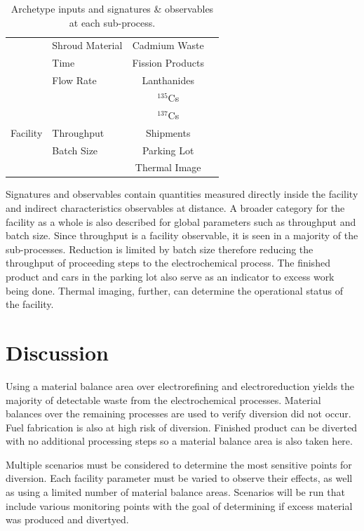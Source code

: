 \documentclass{anstrans}
\begin{document}
\begin{table}[h]
\begin{tabularx}{0.5\textwidth}{llcr}
		& Shroud Material & Cadmium Waste & \cite{lee_korean_2011} \\
		& Time & Fission Products & \cite{Borrelli_2017} \\
		& Flow Rate & Lanthanides & \\
		&  & $^{135}$Cs & \\
		&  & $^{137}$Cs & \\ \hline
		Facility & Throughput & Shipments & \\
		& Batch Size & Parking Lot & \\
		& & Thermal Image & \\
		\hline
	\end{tabularx}
	\caption {Archetype inputs and signatures \& observables at each sub-process.}
	\label {tab:params}
\end{table}

Signatures and observables contain quantities measured directly inside
the facility and indirect characteristics observables at distance. A broader category for the facility as a whole is also described for global parameters such as
throughput and batch size. Since throughput is a facility observable, 
it is seen in a majority of the sub-processes. Reduction is limited by 
batch size therefore reducing the throughput of proceeding steps to the 
electrochemical process. The finished product and cars in the parking lot also serve as an indicator to excess work being done. Thermal imaging, further, can determine the operational status of the facility. 


\section{Discussion}
Using a material balance area over electrorefining and electroreduction yields the majority of detectable waste from 
the electrochemical processes.  Material balances over the remaining 
processes are used to verify diversion did not occur. Fuel fabrication is also at high risk of diversion. 
Finished product can be diverted with no additional processing steps so a material balance area is also taken here. 

Multiple scenarios must be considered to determine the most sensitive points for diversion. 
Each facility parameter must be varied to observe their effects, as well as using a limited number of material balance areas. 
Scenarios will be run that include various monitoring points with the goal of determining if excess material was produced 
and divertyed. 
\end{document}
